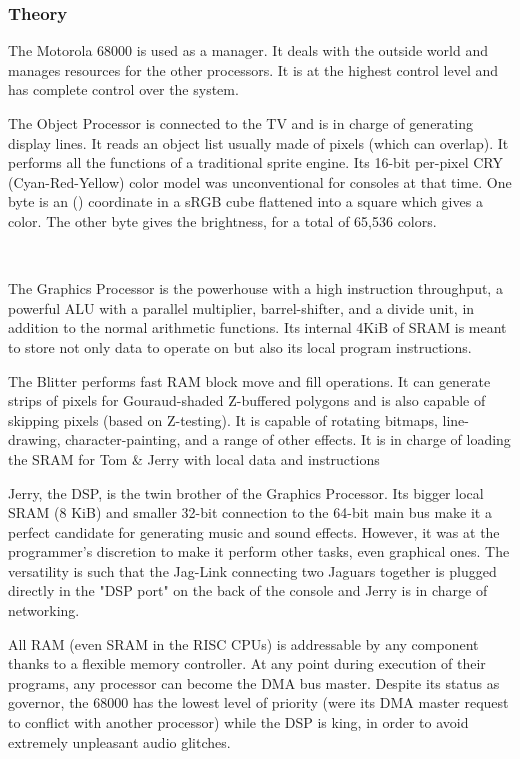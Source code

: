 \subsubsection{Theory}
\par
The Motorola 68000 is used as a manager. It deals with the outside world and manages resources for the other processors. It is at the highest control level and has complete control over the system.\\
\par
The Object Processor is connected to the TV and is in charge of generating display lines. It reads an object list usually made of pixels (which can overlap). It performs all the functions of a traditional sprite engine. Its 16-bit per-pixel CRY (Cyan-Red-Yellow) color model was unconventional for consoles at that time. One byte is an () coordinate in a sRGB cube flattened into a square which gives a color. The other byte gives the brightness, for a total of 65,536 colors.\\
\par
{}\\
\par

\par
The Graphics Processor is the powerhouse with a high instruction throughput, a powerful ALU with a parallel multiplier, barrel-shifter, and a divide unit, in addition to the normal arithmetic functions. Its internal 4KiB of SRAM is meant to store not only data to operate on but also its local program instructions.\\
\par
The Blitter performs fast RAM block move and fill operations. It can generate strips of pixels for Gouraud-shaded Z-buffered polygons and is also capable of skipping pixels (based on Z-testing). It is capable of rotating bitmaps, line-drawing, character-painting, and a range of other effects. It is in charge of loading the SRAM for Tom \& Jerry with local data and instructions\\
\par
Jerry, the DSP, is the twin brother of the Graphics Processor. Its bigger local SRAM (8 KiB) and smaller 32-bit connection to the 64-bit main bus make it a perfect candidate for generating music and sound effects. However, it was at the programmer's discretion to make it perform other tasks, even graphical ones. The versatility is such that the Jag-Link connecting two Jaguars together is plugged directly in the "DSP port" on the back of the console and Jerry is in charge of networking.\\
\par
All RAM (even SRAM in the RISC CPUs) is addressable by any component thanks to a flexible memory controller. At any point during execution of their programs, any processor can become the DMA bus master. Despite its status as governor, the 68000 has the lowest level of priority (were its DMA master request to conflict with another processor) while the DSP is king, in order to avoid extremely unpleasant audio glitches.
\par



